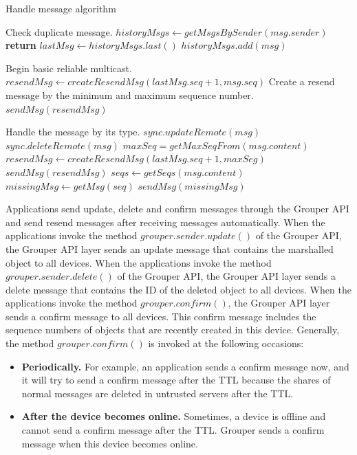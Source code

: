 \documentclass[twocolumn,10pt]{article}
\begin{document}
\begin{algorithm}[t]
	\caption{Handle message algorithm}\label{alg:euclid}
	\begin{algorithmic}[1]		
		\LeftComment Check duplicate message.
		\State  $historyMsgs \gets getMsgsBySender(msg.sender)$
		\State \textbf{return}
		\EndIf
		\State $lastMsg \gets historyMsgs.last()$
		\State $historyMsgs.add(msg)$
		 
		\LeftComment Begin basic reliable multicast.
		\State $resendMsg \gets createResendMsg(lastMsg.seq + 1, msg.seq)$
		\Comment Create a resend message by the minimum and maximum sequence number.
		\State $sendMsg(resendMsg)$
		\EndIf
		
		\LeftComment Handle the message by its type.
		\State $sync.updateRemote(msg)$
		\State $sync.deleteRemote(msg)$
		\State $maxSeq = getMaxSeqFrom(msg.content)$
		\State $resendMsg \gets createResendMsg(lastMsg.seq + 1, maxSeg)$
		\State $sendMsg(resendMsg)$
		\State $seqs \gets getSeqs(msg.content)$
		\State $missingMsg \gets getMsg(seq)$
		\State $sendMsg(missingMsg)$
		\EndFor
		\EndIf
		\EndProcedure
	\end{algorithmic}
\end{algorithm}

Applications send update, delete and confirm messages through the Grouper API and send resend messages after receiving messages automatically.
When the applications invoke the method $grouper.sender.update()$ of the Grouper API, the Grouper API layer sends an update message that contains the marshalled object to all devices.
When the applications invoke the method $grouper.sender.delete()$ of the Grouper API, the Grouper API layer sends a delete message that contains the ID of the deleted object to all devices. 
When the applications invoke the method $grouper.confirm()$, the Grouper API layer sends a confirm message to all devices. 
This confirm message includes the sequence numbers of objects that are recently created in this device.
Generally, the method $grouper.confirm()$ is invoked at the following occasions:

\begin{itemize}
	\setlength{\itemsep}{1pt}
	\setlength{\parskip}{0pt}
	\setlength{\parsep}{0pt}
	\item \textbf{Periodically.}
	For example, an application sends a confirm message now, and it will try to send a confirm message after the TTL because the shares of normal messages are deleted in untrusted servers after the TTL.
	\item \textbf{After the device becomes online.} 
	Sometimes, a device is offline and cannot send a confirm message after the TTL.
	Grouper sends a confirm message when this device becomes online.
\end{itemize}
\end{document}
